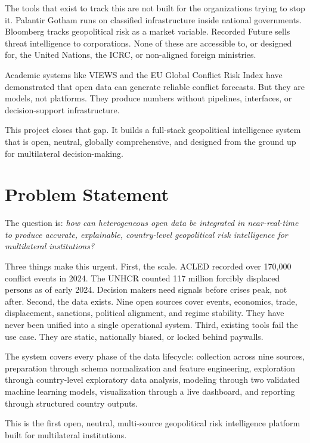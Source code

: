 \documentclass[12pt, onecolumn]{IEEEtran}
\begin{document}
The tools that exist to track this are not built for the organizations trying to stop it. Palantir Gotham runs on classified infrastructure inside national governments. Bloomberg tracks geopolitical risk as a market variable. Recorded Future sells threat intelligence to corporations. None of these are accessible to, or designed for, the United Nations, the ICRC, or non-aligned foreign ministries.

Academic systems like VIEWS \cite{views2023} and the EU Global Conflict Risk Index \cite{gcri2020} have demonstrated that open data can generate reliable conflict forecasts. But they are models, not platforms. They produce numbers without pipelines, interfaces, or decision-support infrastructure.

This project closes that gap. It builds a full-stack geopolitical intelligence system that is open, neutral, globally comprehensive, and designed from the ground up for multilateral decision-making.


\section{Problem Statement}

The question is: \textit{how can heterogeneous open data be integrated in near-real-time to produce accurate, explainable, country-level geopolitical risk intelligence for multilateral institutions?}

Three things make this urgent. First, the scale. ACLED recorded over 170,000 conflict events in 2024. The UNHCR counted 117 million forcibly displaced persons as of early 2024. Decision makers need signals before crises peak, not after. Second, the data exists. Nine open sources cover events, economics, trade, displacement, sanctions, political alignment, and regime stability. They have never been unified into a single operational system. Third, existing tools fail the use case. They are static, nationally biased, or locked behind paywalls.

The system covers every phase of the data lifecycle: collection across nine sources, preparation through schema normalization and feature engineering, exploration through country-level exploratory data analysis, modeling through two validated machine learning models, visualization through a live dashboard, and reporting through structured country outputs.

This is the first open, neutral, multi-source geopolitical risk intelligence platform built for multilateral institutions.
\end{document}
